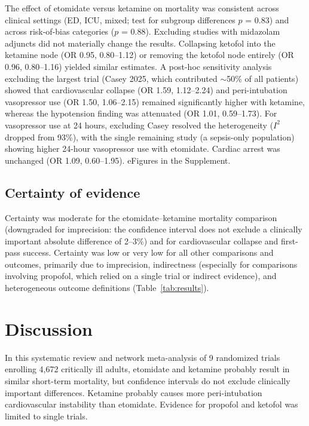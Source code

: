 \documentclass[11pt]{article}
\begin{document}
The effect of etomidate versus ketamine on mortality was consistent across clinical settings (ED, ICU, mixed; test for subgroup differences $p$ = 0.83) and across risk-of-bias categories ($p$ = 0.88). Excluding studies with midazolam adjuncts did not materially change the results. Collapsing ketofol into the ketamine node (OR 0.95, 0.80--1.12) or removing the ketofol node entirely (OR 0.96, 0.80--1.16) yielded similar estimates. A post-hoc sensitivity analysis excluding the largest trial (Casey 2025, which contributed $\sim$50\% of all patients) showed that cardiovascular collapse (OR 1.59, 1.12--2.24) and peri-intubation vasopressor use (OR 1.50, 1.06--2.15) remained significantly higher with ketamine, whereas the hypotension finding was attenuated (OR 1.01, 0.59--1.73). For vasopressor use at 24 hours, excluding Casey resolved the heterogeneity ($I^2$ dropped from 93\%), with the single remaining study (a sepsis-only population) showing higher 24-hour vasopressor use with etomidate. Cardiac arrest was unchanged (OR 1.09, 0.60--1.95). eFigures in the Supplement.

\subsection{Certainty of evidence}

Certainty was moderate for the etomidate--ketamine mortality comparison (downgraded for imprecision: the confidence interval does not exclude a clinically important absolute difference of 2--3\%) and for cardiovascular collapse and first-pass success. Certainty was low or very low for all other comparisons and outcomes, primarily due to imprecision, indirectness (especially for comparisons involving propofol, which relied on a single trial or indirect evidence), and heterogeneous outcome definitions (Table~\ref{tab:results}).

\section{Discussion}

In this systematic review and network meta-analysis of 9 randomized trials enrolling 4,672 critically ill adults, etomidate and ketamine probably result in similar short-term mortality, but confidence intervals do not exclude clinically important differences. Ketamine probably causes more peri-intubation cardiovascular instability than etomidate. Evidence for propofol and ketofol was limited to single trials.
\end{document}
